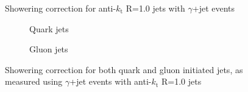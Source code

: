 \clearpage
\begin{figure}[!ht]
 \centering
 \caption[Showering correction for anti-$k_{\mathrm t}$ R=1.0 jets with $\gamma$+jet events]
 {\small Showering correction for anti-$k_{\mathrm t}$ R=1.0 jets with $\gamma$+jet events}
 \label{plot:GJetShowering10App}
\end{figure}

\begin{figure}[!ht]
 \centering
 \begin{subfigure}{.5\textwidth}
  \centering
  \caption{Quark jets}
 \end{subfigure}%
 \begin{subfigure}{.5\textwidth}
  \centering
  \caption{Gluon jets}
 \end{subfigure}
 \caption[Quark/gluon jet showering correction, anti-$k_{\mathrm t}$ R=1.0, $\gamma$+jet]
 {\small Showering correction for both quark and gluon initiated jets, as measured using $\gamma$+jet events with anti-$k_{\mathrm t}$ R=1.0 jets}
 \label{plot:GJetShoweringFlav10App}
\end{figure}
